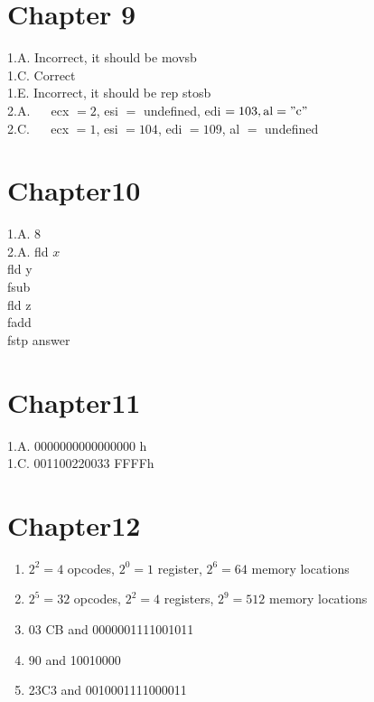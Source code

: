 \documentclass[10pt]{book}
\begin{document}
\section*{Chapter 9}
1.A. Incorrect, it should be movsb\\
1.C. Correct\\
1.E. Incorrect, it should be rep stosb\\
2.A. $\quad$ ecx $=2$, esi $=$ undefined, edi $=103, \mathrm{al}=" \mathrm{c} "$\\
2.C. $\quad$ ecx $=1$, esi $=104$, edi $=109$, al $=$ undefined

\section*{Chapter10}
1.A. 8\\
2.A. fld $x$\\
fld y\\
fsub\\
fld z\\
fadd\\
fstp answer

\section*{Chapter11}
1.A. 0000000000000000 h\\
1.C. 001100220033 FFFFh

\section*{Chapter12}
\begin{enumerate}
  \item $2^{2}=4$ opcodes, $2^{0}=1$ register, $2^{6}=64$ memory locations
  \item $2^{5}=32$ opcodes, $2^{2}=4$ registers, $2^{9}=512$ memory locations
  \item 03 CB and 0000001111001011
  \item 90 and 10010000
  \item 23C3 and 0010001111000011
\end{enumerate}


\end{document}
